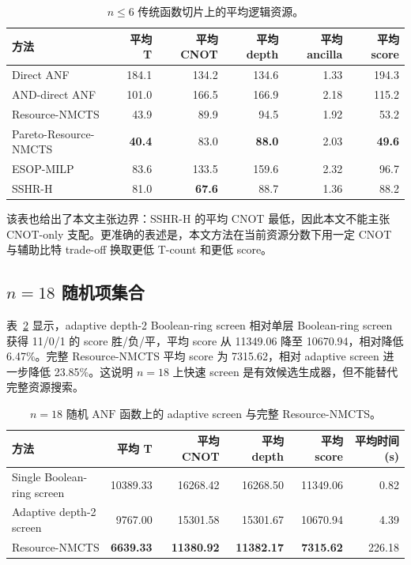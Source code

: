 \documentclass[UTF8,fontset=macnew,11pt]{ctexart}
\newcommand{\method}{Resource-NMCTS}
\newcommand{\pareto}{Pareto-Resource-NMCTS}
\newcommand{\screen}{Boolean-ring screen}
\newcommand{\anf}{\ensuremath{\mathrm{ANF}}}
\begin{document}
\begin{table}[t]
\centering
\small
\caption{$n\leq6$ 传统函数切片上的平均逻辑资源。}
\label{tab:traditional}
\begin{tabular}{lrrrrr}
\toprule
方法 & 平均 T & 平均 CNOT & 平均 depth & 平均 ancilla & 平均 score \\
\midrule
Direct ANF & 184.1 & 134.2 & 134.6 & 1.33 & 194.3 \\
AND-direct ANF & 101.0 & 166.5 & 166.9 & 2.18 & 115.2 \\
\method{} & 43.9 & 89.9 & 94.5 & 1.92 & 53.2 \\
\pareto{} & \textbf{40.4} & 83.0 & \textbf{88.0} & 2.03 & \textbf{49.6} \\
ESOP-MILP & 83.6 & 133.5 & 159.6 & 2.32 & 96.7 \\
SSHR-H & 81.0 & \textbf{67.6} & 88.7 & 1.36 & 88.2 \\
\bottomrule
\end{tabular}
\end{table}

该表也给出了本文主张边界：SSHR-H 的平均 CNOT 最低，因此本文不能主张 CNOT-only 支配。更准确的表述是，本文方法在当前资源分数下用一定 CNOT 与辅助比特 trade-off 换取更低 T-count 和更低 score。

\subsection{\texorpdfstring{$n=18$}{n=18} 随机项集合}

表~\ref{tab:n18} 显示，adaptive depth-2 \screen{} 相对单层 \screen{} 获得 11/0/1 的 score 胜/负/平，平均 score 从 11349.06 降至 10670.94，相对降低 6.47\%。完整 \method{} 平均 score 为 7315.62，相对 adaptive screen 进一步降低 23.85\%。这说明 $n=18$ 上快速 screen 是有效候选生成器，但不能替代完整资源搜索。

\begin{table}[t]
\centering
\small
\caption{$n=18$ 随机 \anf{} 函数上的 adaptive screen 与完整 \method{}。}
\label{tab:n18}
\begin{tabular}{lrrrrr}
\toprule
方法 & 平均 T & 平均 CNOT & 平均 depth & 平均 score & 平均时间(s) \\
\midrule
Single \screen{} & 10389.33 & 16268.42 & 16268.50 & 11349.06 & 0.82 \\
Adaptive depth-2 screen & 9767.00 & 15301.58 & 15301.67 & 10670.94 & 4.39 \\
\method{} & \textbf{6639.33} & \textbf{11380.92} & \textbf{11382.17} & \textbf{7315.62} & 226.18 \\
\bottomrule
\end{tabular}
\end{table}
\end{document}
